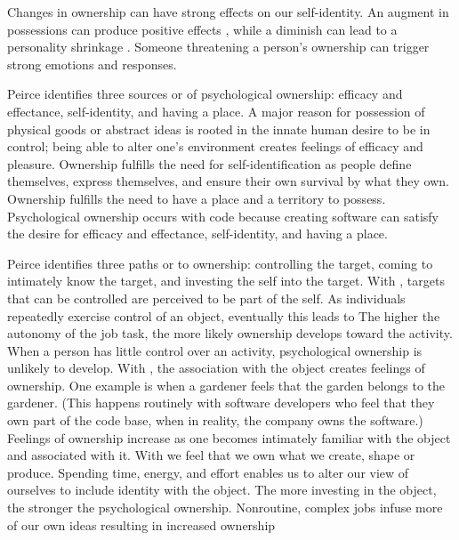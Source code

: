 Changes in ownership can have strong effects on our self-identity. An augment in possessions can produce positive effects \cite{Formanek1994}, while a diminish can lead to a personality shrinkage \cite{James1890}. Someone threatening a person's ownership can trigger strong emotions and responses.

Peirce \cite{Pierce2001} identifies three sources or  of psychological ownership: efficacy and effectance, self-identity, and having a place. A major reason for possession of physical goods or abstract ideas is rooted in the innate human desire to be in control; being able to alter one's environment creates feelings of efficacy and pleasure. Ownership fulfills the need for self-identification as people define themselves, express themselves, and ensure their own survival by what they own. Ownership fulfills the need to have a place and a territory to possess.  Psychological ownership occurs with code because creating software can satisfy the desire for efficacy and effectance, self-identity, and having a place.

Peirce identifies three paths or  to ownership: controlling the target, coming to intimately know the target, and investing the self into the target. With , targets that can be controlled are perceived to be part of the self.  As  individuals repeatedly exercise control of an object, eventually this leads to  The higher the autonomy of the job task, the more likely ownership develops toward the activity. When a person has little control over an activity, psychological ownership is unlikely to develop. With , the association with the object creates feelings of ownership. One example is when a gardener feels that the garden belongs to the gardener. (This happens routinely with software developers who feel that they own part of the code base, when in reality, the company owns the software.) Feelings of ownership increase as one becomes intimately familiar with the object and associated with it. With  we feel that we own what we create, shape or produce. Spending time, energy, and effort enables us to alter our view of ourselves to include identity with the object. The more investing in the object, the stronger the psychological ownership. Nonroutine, complex jobs infuse more of our own ideas resulting in increased ownership

